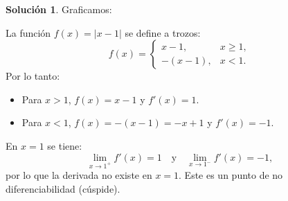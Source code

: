 \documentclass{article}
\theoremstyle{definition}
\newtheorem*{solution}{Solución}
\begin{document}
\begin{solution} 
Graficamos:

\begin{center}
\end{center}
    
La función \( f(x) = |x - 1| \) se define a trozos:
\[
f(x)=
\begin{cases}
x-1, & x\geq 1,\\
-(x-1), & x<1.
\end{cases}
\]
Por lo tanto:
\begin{itemize}
    \item Para \( x > 1 \), \( f(x)=x-1 \) y \( f'(x)=1 \).
    \item Para \( x < 1 \), \( f(x)=-(x-1)=-x+1 \) y \( f'(x)=-1 \).
\end{itemize}
En \( x = 1 \) se tiene:
\[
\lim_{x\to1^+} f'(x)=1 \quad\text{y}\quad \lim_{x\to1^-} f'(x)=-1,
\]
por lo que la derivada no existe en \( x = 1 \). Este es un punto de no diferenciabilidad (cúspide).
\end{solution}
\end{document}
